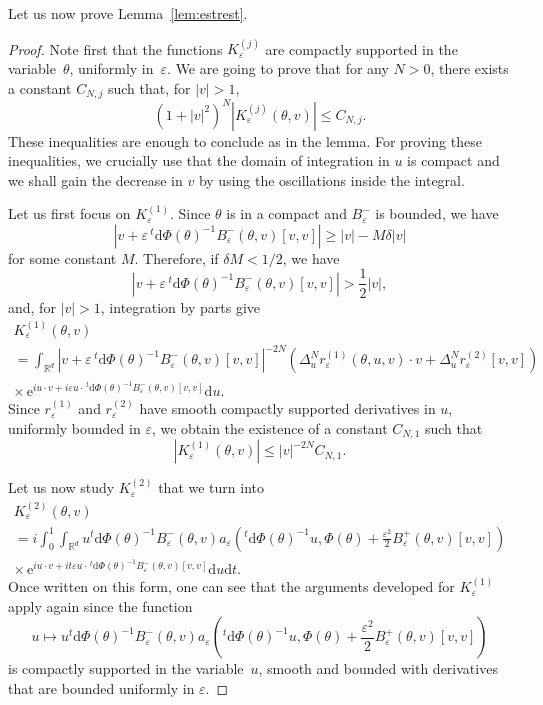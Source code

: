 \documentclass[10pt]{amsart}
\theoremstyle{definition}
\newcommand*\R{{\mathbb R}}
\newcommand*\eps{\varepsilon}
\numberwithin{equation}{section}
\newcommand{\ee}{{\mathrm e}}
\newcommand*{\dd}{\mathrm{d}}
\newcommand*{\dt}{\dd t}
\newcommand*{\du}{\dd u}
\newcommand*{\dPhi}{\dd \Phi} %
\begin{document}

Let us now prove Lemma~\ref{lem:estrest}.

\begin{proof}
Note first that the functions $K_\eps^{(j)}$ are compactly supported in the variable~$\theta$, uniformly in~$\eps$. We are going to prove that for any $N>0$, there exists a constant $C_{N,j}$ such that, for $| v|>1$,
\[
(1+|v|^2)^N \left| K_\eps^{(j)} (\theta,v)\right| \leq C_{N,j}.
\]
These inequalities are enough to conclude as in the lemma. For proving these \linebreak inequalities, we crucially use that the domain of integration in $u$ is compact and we shall gain the decrease in $v$ by using the oscillations inside the integral.


Let us first focus on $K_\eps^{(1)}$. Since $\theta$ is in a compact and $B_\eps^-$ is bounded, we have
\[
\left| v+\eps \,^t\dPhi (\theta)^{-1} B_\eps^-(\theta,v) [v,v]\right|\geq | v| -M\delta | v|
\]
for some constant $M$. Therefore, if $\delta M<1/2$, we have
\[
\left| v+\eps \,^t\dPhi (\theta)^{-1} B_\eps^-(\theta,v) [v,v]\right|> \frac{1}{2} | v|,
\]
and, for $|v|>1$, integration by parts give
\begin{multline*}
K_\eps^{(1)}(\theta,v)\\
=\int_{\R^{d}} \left| v+\eps \,^t\dPhi (\theta)^{-1} B_\eps^-(\theta,v) [v,v]\right|^{-2N}\left(\Delta^N_u r_\eps^{(1)}(\theta, u, v)\cdot v+ \Delta^N_u r_\eps^{(2)} [v,v]\right)
\\
\times\, {\ee}^{i u\cdot v +i\eps u\cdot \,^t \dPhi (\theta)^{-1} B_\eps^-{(\theta,v)[v,v]} } \du.
\end{multline*}
Since $r_\eps^{(1)}$ and $r_\eps^{(2)}$ have smooth compactly supported derivatives in $u$, uniformly bounded in $\eps$, we obtain the existence of a constant $C_{N,1}$ such that
\[
| K_\eps^{(1)}(\theta,v)| \leq |v|^{-2N} C_{N,1}.
\]


Let us now study $K_\eps^{(2)}$ that we turn into
\begin{multline*}
K_\eps^{(2)}(\theta,v)\\
=i \int_0^1\int_{\R^{d}} u {}^t\dPhi (\theta)^{-1} B_\eps ^-(\theta,v) a_\eps\left(^t \dPhi (\theta)^{-1} u,\Phi(\theta)+\frac{\eps^2}{2} B_\eps^+(\theta,v)[v,v]\right)
\\ \times \, {\ee}^{i u\cdot v
+i t \eps u\cdot \,^t \dPhi (\theta)^{-1} B_\eps^-(\theta,v)[v,v]} \du\dt.
\end{multline*}
Once written on this form, one can see that the arguments developed for $K_\eps^{(1)}$ apply again since the function
\[
u\mapsto u {}^t\dPhi (\theta)^{-1} B_\eps ^-(\theta,v) a_\eps\left(^t \dPhi (\theta)^{-1} u,\Phi(\theta)+\frac{\eps^2}{2} B_\eps^+(\theta,v)[v,v]\right)
\]
is compactly supported in the variable~$u$, smooth and bounded with derivatives that are bounded uniformly in $\eps$.
\end{proof}
\end{document}
